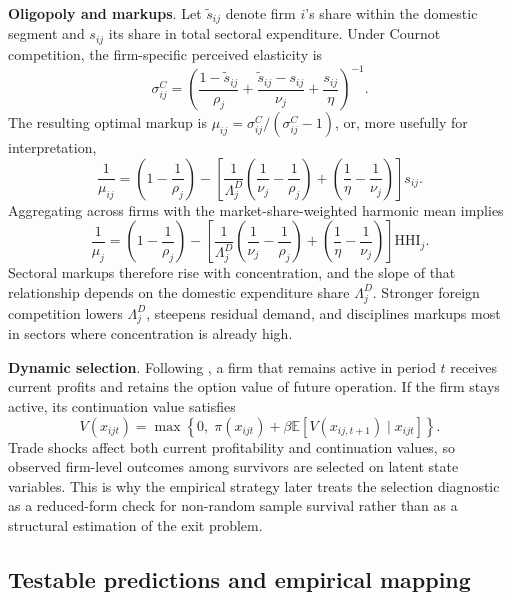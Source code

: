 ﻿\documentclass[12pt]{article}
\begin{document}
\textbf{Oligopoly and markups}. Let $\tilde{s}_{ij}$ denote firm $i$'s share within the domestic segment and $s_{ij}$ its share in total sectoral expenditure. Under Cournot competition, the firm-specific perceived elasticity is
\[
\sigma_{ij}^C =
\left(
\frac{1-\tilde{s}_{ij}}{\rho_j}
+
\frac{\tilde{s}_{ij}-s_{ij}}{\nu_j}
+
\frac{s_{ij}}{\eta}
\right)^{-1}.
\]
The resulting optimal markup is $\mu_{ij} = \sigma_{ij}^C / (\sigma_{ij}^C-1)$, or, more usefully for interpretation,
\begin{equation}
\frac{1}{\mu_{ij}} =
\left(1-\frac{1}{\rho_j}\right)
-
\left[
\frac{1}{\Lambda_j^D}\left(\frac{1}{\nu_j}-\frac{1}{\rho_j}\right)
+
\left(\frac{1}{\eta}-\frac{1}{\nu_j}\right)
\right] s_{ij}.
\label{eq:firm_inverse_markup}
\end{equation}
Aggregating across firms with the market-share-weighted harmonic mean implies
\begin{equation}
\frac{1}{\mu_j} =
\left(1-\frac{1}{\rho_j}\right)
-
\left[
\frac{1}{\Lambda_j^D}\left(\frac{1}{\nu_j}-\frac{1}{\rho_j}\right)
+
\left(\frac{1}{\eta}-\frac{1}{\nu_j}\right)
\right] \text{HHI}_j.
\label{eq:sector_inverse_markup}
\end{equation}
Sectoral markups therefore rise with concentration, and the slope of that relationship depends on the domestic expenditure share $\Lambda_j^D$. Stronger foreign competition lowers $\Lambda_j^D$, steepens residual demand, and disciplines markups most in sectors where concentration is already high.

\textbf{Dynamic selection}. Following \textcite{aguirregabiriaDynamicGamesEmpirical}, a firm that remains active in period $t$ receives current profits and retains the option value of future operation. If the firm stays active, its continuation value satisfies
\[
V(x_{ijt}) = \max \left\{0,\; \pi(x_{ijt}) + \beta \mathbb{E}[V(x_{ij,t+1}) \mid x_{ijt}] \right\}.
\]
Trade shocks affect both current profitability and continuation values, so observed firm-level outcomes among survivors are selected on latent state variables. This is why the empirical strategy later treats the selection diagnostic as a reduced-form check for non-random sample survival rather than as a structural estimation of the exit problem.

\subsection{Testable predictions and empirical mapping}
\end{document}
